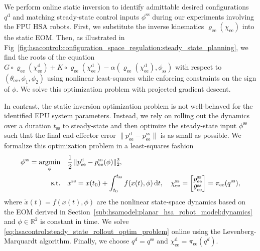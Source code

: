 We perform online static inversion to identify admittable desired configurations $q^\mathrm{d}$ and matching steady-state control inputs $\phi^\mathrm{ss}$ during our experiments involving the FPU \gls{HSA} robots. First, we substitute the inverse kinematics $\varrho_\mathrm{ee}(\chi_\mathrm{ee})$ into the static \gls{EOM}. Then, as illustrated in Fig~\ref{fig:hsacontrol:configuration_space_regulation:steady_state_planning}, we find the roots of the equation $G\circ\varrho_\mathrm{ee}(\chi_\mathrm{ee}^\mathrm{d}) + K\circ\varrho_\mathrm{ee}(\chi_\mathrm{ee}^\mathrm{d})-\alpha(\varrho_\mathrm{ee}(\chi_\mathrm{ee}^\mathrm{d}), \phi_\mathrm{ss})$ with respect to $(\theta_\mathrm{ee},\phi_1, \phi_2)$ using nonlinear least-squares while enforcing constraints on the sign of $\phi$. We solve this optimization problem with projected gradient descent.

In contrast, the static inversion optimization problem is not well-behaved for the identified EPU system parameters. Instead, we rely on rolling out the dynamics over a duration $t_\mathrm{ss}$ to steady-state and then optimize the steady-state input $\phi^\mathrm{ss}$ such that the final end-effector error $\lVert p_\mathrm{ee}^\mathrm{d} - p_\mathrm{ee}^\mathrm{ss} \rVert$ is as small as possible. We formalize this optimization problem in a least-squares fashion
\begin{equation}\label{eq:hsacontrol:steady_state_rollout_optim_problem}
\begin{aligned}
    \phi^\mathrm{ss} = \operatorname*{\arg\!\min}_\mathrm{\phi} \quad & \frac{1}{2} \, \lVert p_\mathrm{ee}^\mathrm{d} - p_\mathrm{ee}^\mathrm{ss}(\phi) \rVert_2^2,\\
    \textrm{s.t.} \quad & x^\mathrm{ss} = x(t_0) + \int_{t_0}^{t_\mathrm{ss}} f(x(t), \phi) \, \mathrm{d}t, \quad \chi_\mathrm{ee}^\mathrm{ss} = \begin{bmatrix}
        p_\mathrm{ee}^\mathrm{ss}\\
        \theta_\mathrm{ee}^\mathrm{ss}
    \end{bmatrix} = \pi_\mathrm{ee}(q^\mathrm{ss}),\\
\end{aligned}
\end{equation}
where $\dot{x}(t) = f(x(t), \phi)$ are the nonlinear state-space dynamics based on the \gls{EOM} derived in Section~\ref{sub:hsamodel:planar_hsa_robot_model:dynamics} and $\phi \in \mathbb{R}^2$ is constant in time. We solve \eqref{eq:hsacontrol:steady_state_rollout_optim_problem} online using the Levenberg-Marquardt algorithm. Finally, we choose $q^d = q^\mathrm{ss}$ and $\chi_\mathrm{ee}^\mathrm{d} = \pi_\mathrm{ee}(q^d)$.

